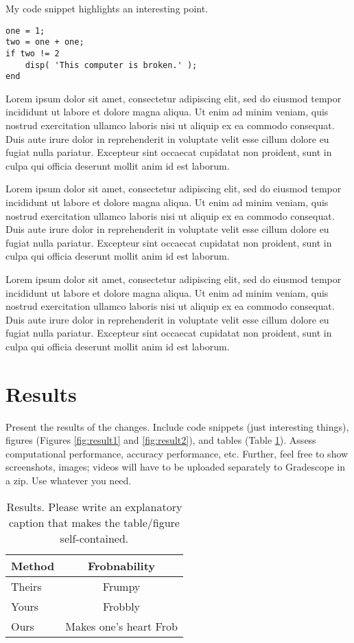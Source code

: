 \documentclass[10pt,twocolumn,letterpaper]{article}
\begin{document}
My code snippet highlights an interesting point.
\begin{lstlisting}[style=Matlab-editor]
one = 1;
two = one + one;
if two != 2
    disp( 'This computer is broken.' );
end
\end{lstlisting}

Lorem ipsum dolor sit amet, consectetur adipiscing elit, sed do eiusmod tempor incididunt ut labore et dolore magna aliqua. Ut enim ad minim veniam, quis nostrud exercitation ullamco laboris nisi ut aliquip ex ea commodo consequat. Duis aute irure dolor in reprehenderit in voluptate velit esse cillum dolore eu fugiat nulla pariatur. Excepteur sint occaecat cupidatat non proident, sunt in culpa qui officia deserunt mollit anim id est laborum.

Lorem ipsum dolor sit amet, consectetur adipiscing elit, sed do eiusmod tempor incididunt ut labore et dolore magna aliqua. Ut enim ad minim veniam, quis nostrud exercitation ullamco laboris nisi ut aliquip ex ea commodo consequat. Duis aute irure dolor in reprehenderit in voluptate velit esse cillum dolore eu fugiat nulla pariatur. Excepteur sint occaecat cupidatat non proident, sunt in culpa qui officia deserunt mollit anim id est laborum.

Lorem ipsum dolor sit amet, consectetur adipiscing elit, sed do eiusmod tempor incididunt ut labore et dolore magna aliqua. Ut enim ad minim veniam, quis nostrud exercitation ullamco laboris nisi ut aliquip ex ea commodo consequat. Duis aute irure dolor in reprehenderit in voluptate velit esse cillum dolore eu fugiat nulla pariatur. Excepteur sint occaecat cupidatat non proident, sunt in culpa qui officia deserunt mollit anim id est laborum.

\section{Results}

Present the results of the changes. Include code snippets (just interesting things), figures (Figures \ref{fig:result1} and \ref{fig:result2}), and tables (Table \ref{tab:example}). Assess computational performance, accuracy performance, etc. Further, feel free to show screenshots, images; videos will have to be uploaded separately to Gradescope in a zip. Use whatever you need.

\begin{table}
\begin{center}
\begin{tabular}{ l c }
\toprule
Method & Frobnability \\
\midrule
Theirs & Frumpy \\
Yours & Frobbly \\
Ours & Makes one's heart Frob\\
\bottomrule
\end{tabular}
\end{center}
\caption{Results. Please write an explanatory caption that makes the table/figure self-contained.}
\label{tab:example}
\end{table}
\end{document}
